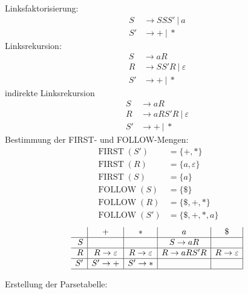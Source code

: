 \documentclass[a4paper,10pt]{scrartcl}
\newcommand{\FIRST}{\operatorname{FIRST}}
\newcommand{\FOLLOW}{\operatorname{FOLLOW}}
\begin{document}
\section{}
Linksfaktorisierung:
\begin{align*}
 S &\to SSS'\ |\ a \\
 S' &\to +\ |\ *
\end{align*}
Linksrekursion:
\begin{align*}
 S &\to aR \\
 R &\to SS'R\ |\ \varepsilon \\
 S' &\to +\ |\ *
\end{align*}
indirekte Linksrekursion
\begin{align*}
 S &\to aR \\
 R &\to aRS'R\ |\ \varepsilon \\
 S' &\to +\ |\ * 
\end{align*}
Bestimmung der FIRST- und FOLLOW-Mengen:
\begin{align*}
 \FIRST(S') &= \{+,*\} \\
 \FIRST(R) &= \{a, \varepsilon\} \\
 \FIRST(S) &= \{a\} \\\hline
 \FOLLOW(S) &= \{\$\} \\
 \FOLLOW(R) &= \{\$, +, *\} \\
 \FOLLOW(S') &= \{\$,+,*,a\}
\end{align*}
\[
 \begin{array}{r|c|c|c|c|}
   & + & * & a & \$ \\\hline
   S &  &  & S \to aR & \\\hline
   R & R \to \varepsilon & R \to \varepsilon & R \to aRS'R & R \to \varepsilon \\\hline
   S' & S' \to + & S' \to * & & \\\hline 
 \end{array}
\]



Erstellung der Parsetabelle:
\end{document}
